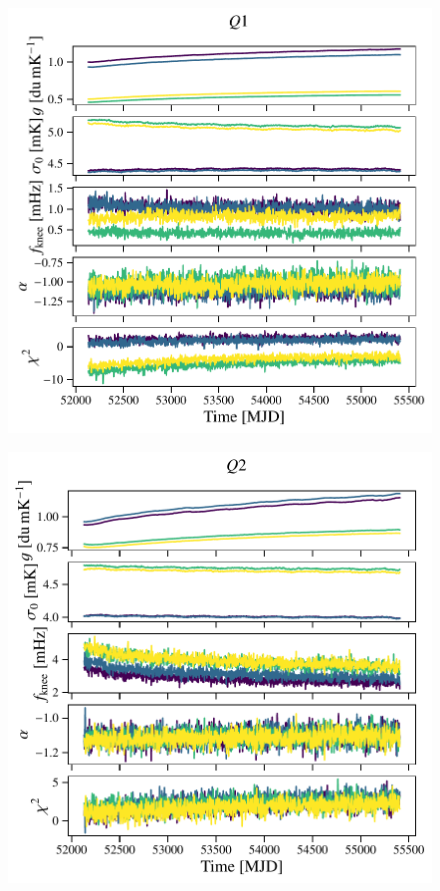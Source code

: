 \documentclass[twocolumn]{../../common/aa}
\begin{document}
\begin{figure}
	\centering
	\includegraphics[width=\columnwidth]{figures/inst_040-WMAP_Q1.pdf}
\end{figure}
\begin{figure}
	\centering
	\includegraphics[width=\columnwidth]{figures/inst_040-WMAP_Q2.pdf}
\end{figure}
\end{document}
